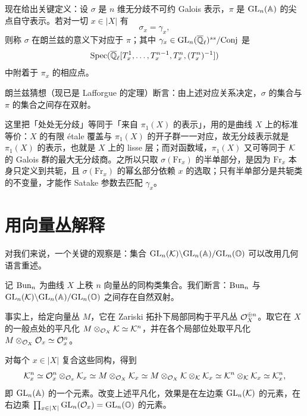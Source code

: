 现在给出关键定义：设 $\sigma$ 是 $n$ 维无分歧不可约 Galois 表示，$\pi$ 是 $\mathrm{GL}_n(\mathbb{A})$ 的尖点自守表示。若对一切 $x\in|X|$ 有
\[
\sigma_x=\gamma_x,
\]
则称 $\sigma$ 在朗兰兹的意义下对应于 $\pi$；其中 $\gamma_x\in\mathrm{GL}_n(\overline{\mathbb{Q}}_\ell)^{ss}/\mathrm{Conj}$ 是
\[
\operatorname{Spec}(\overline{\mathbb{Q}}_\ell[T_x^1,\dots,T_x^{n-1},T_x^n,(T_x^n)^{-1}])
\]
中附着于 $\pi_x$ 的相应点。

朗兰兹猜想（现已是 Lafforgue 的定理）断言：由上述对应关系决定，$\sigma$ 的集合与 $\pi$ 的集合之间存在双射。

\begin{annote}
这里把「处处无分歧」等同于「来自 $\pi_1(X)$ 的表示」，用的是曲线 $X$ 上的标准等价：$X$ 的有限 \'etale 覆盖与 $\pi_1(X)$ 的开子群一一对应，故无分歧表示就是 $\pi_1(X)$ 的表示，也就是 $X$ 上的 lisse 层；而对函数域，$\pi_1(X)$ 又可等同于 $\mathcal{K}$ 的 Galois 群的最大无分歧商。之所以只取 $\sigma(\mathrm{Fr}_x)$ 的半单部分，是因为 $\mathrm{Fr}_x$ 本身只定义到共轭，且 $\sigma(\mathrm{Fr}_x)$ 的幂幺部分依赖 $x$ 的选取；只有半单部分是共轭类的不变量，才能作 Satake 参数去匹配 $\gamma_x$。\par{}
\end{annote}

\section{用向量丛解释}

对我们来说，一个关键的观察是：集合 $\mathrm{GL}_n(\mathcal{K})\backslash\allowbreak\mathrm{GL}_n(\mathbb{A})/\mathrm{GL}_n(\mathbb{O})$ 可以改用几何语言重述。

记 $\operatorname{Bun}_n$ 为曲线 $X$ 上秩 $n$ 向量丛的同构类集合。我们断言：$\operatorname{Bun}_n$ 与 $\mathrm{GL}_n(\mathcal{K})\backslash\allowbreak\mathrm{GL}_n(\mathbb{A})/\mathrm{GL}_n(\mathbb{O})$ 之间存在自然双射。

事实上，给定向量丛 $M$，它在 Zariski 拓扑下局部同构于平凡丛 $\mathcal{O}_X^{\oplus n}$。取它在 $X$ 的一般点处的平凡化 $M\otimes_{\mathcal{O}_X}\mathcal{K}\simeq\mathcal{K}^n$，并在各个局部位处取平凡化 $M\otimes_{\mathcal{O}_X}\mathcal{O}_x\simeq\mathcal{O}_x^n$。

对每个 $x\in|X|$ 复合这些同构，得到
\[
\mathcal{K}_x^n\simeq\mathcal{O}_x^n\otimes_{\mathcal{O}_x}\mathcal{K}_x\simeq M\otimes_{\mathcal{O}_X}\mathcal{K}_x
\simeq M\otimes_{\mathcal{O}_X}\mathcal{K}\otimes_{\mathcal{K}}\mathcal{K}_x\simeq\mathcal{K}^n\otimes_{\mathcal{K}}\mathcal{K}_x\simeq\mathcal{K}_x^n,
\]
即 $\mathrm{GL}_n(\mathbb{A})$ 的一个元素。改变上述平凡化，效果是在左边乘 $\mathrm{GL}_n(\mathcal{K})$ 的元素，在右边乘 $\prod_{x\in|X|}\mathrm{GL}_n(\mathcal{O}_x)=\mathrm{GL}_n(\mathbb{O})$ 的元素。

